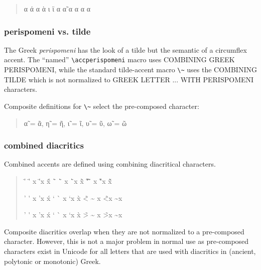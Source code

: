\documentclass[a4paper]{article}
\begin{document}
\begin{quote}
  \acctonos α       \'α
  \accvaria α       \`α
  \accdialytika ι   \"ι
  \accperispomeni α \~α
  \accpsili α       \>α
  \accdasia α       \<α
\end{quote}


\subsubsection{perispomeni vs. tilde}

The Greek \emph{perispomeni} has the look of a tilde but the semantic
of a circumflex accent.
The ``named'' \verb|\accperispomeni| macro uses COMBINING GREEK PERISPOMENI,
while the standard tilde-accent macro \verb|\~| uses the COMBINING TILDE
which is not normalized to GREEK LETTER ... WITH PERISPOMENI
characters.

Composite definitions for \verb|\~| select the pre-composed character:

\begin{quote}
  \~α = ᾶ, \~η = ῆ, \~ι = ῖ, \~υ = ῦ, \~ω = ῶ
\end{quote}


\subsubsection{combined diacritics}

Combined accents are defined using combining diacritical characters.

\begin{quote}
\accdialytikatonos\textiota{}     \"'\textiota{} \"\'\textiota{}
\accdialytikatonos x              \"'x           \"\'x
\accdialytikavaria\textiota{}     \"`\textiota{} \"\`\textiota{}
\accdialytikavaria x              \"`x           \"\`x
\accdialytikaperispomeni\textiota{} \~"\textiota{} \~\"\textiota{}
\accdialytikaperispomeni x        \~"x           \~\"x

\accdasiaoxia\textiota{}          \<'\textiota{} \<\'\textiota{}
\accdasiaoxia x                   \<'x           \<\'x
\accdasiavaria\textiota{}         \<`\textiota{} \<\`\textiota{}
\accdasiavaria x                  \<`x           \<\`x
\accdasiaperispomeni\textiota{}   \~<\textiota{} \~\<\textiota{}
\accdasiaperispomeni x            \~<x           \~\<x

\accpsilioxia\textiota{}          \>'\textiota{} \>\'\textiota{}
\accpsilioxia x                   \>'x           \>\'x
\accpsilivaria\textiota{}         \>`\textiota{} \>\`\textiota{}
\accpsilivaria x                  \>`x           \>\`x
\accpsiliperispomeni\textiota{}   \~>\textiota{} \~\>\textiota{}
\accpsiliperispomeni x            \~>x           \~\>x
\end{quote}
Composite diacritics overlap when they are not normalized to a pre-composed
character. However, this is not a major problem in normal use as
pre-composed characters exist in Unicode for all letters that are
used with diacritics in (ancient, polytonic or monotonic) Greek.
\end{document}
